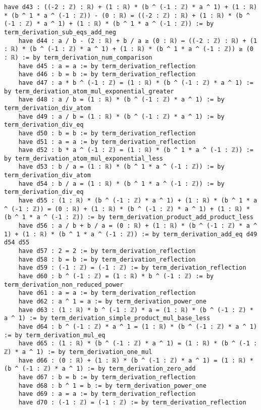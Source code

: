 \documentclass{article}
\begin{document}
\begin{tcolorbox}[colback=white!10, width=\linewidth]
\begin{lstlisting}[language=Lean4]
    have d43 : ((-2 : ℤ) : ℝ) + (1 : ℝ) * (b ^ (-1 : ℤ) * a ^ 1) + (1 : ℝ) * (b ^ 1 * a ^ (-1 : ℤ)) - (0 : ℝ) = ((-2 : ℤ) : ℝ) + (1 : ℝ) * (b ^ (-1 : ℤ) * a ^ 1) + (1 : ℝ) * (b ^ 1 * a ^ (-1 : ℤ)) := by term_derivation_sub_eqs_add_neg
    have d44 : a / b - (2 : ℝ) + b / a ≥ (0 : ℝ) ↔ ((-2 : ℤ) : ℝ) + (1 : ℝ) * (b ^ (-1 : ℤ) * a ^ 1) + (1 : ℝ) * (b ^ 1 * a ^ (-1 : ℤ)) ≥ (0 : ℝ) := by term_derivation_num_comparison
    have d45 : a = a := by term_derivation_reflection
    have d46 : b = b := by term_derivation_reflection
    have d47 : a * b ^ (-1 : ℤ) = (1 : ℝ) * (b ^ (-1 : ℤ) * a ^ 1) := by term_derivation_atom_mul_exponential_greater
    have d48 : a / b = (1 : ℝ) * (b ^ (-1 : ℤ) * a ^ 1) := by term_derivation_div_atom
    have d49 : a / b = (1 : ℝ) * (b ^ (-1 : ℤ) * a ^ 1) := by term_derivation_div_eq
    have d50 : b = b := by term_derivation_reflection
    have d51 : a = a := by term_derivation_reflection
    have d52 : b * a ^ (-1 : ℤ) = (1 : ℝ) * (b ^ 1 * a ^ (-1 : ℤ)) := by term_derivation_atom_mul_exponential_less
    have d53 : b / a = (1 : ℝ) * (b ^ 1 * a ^ (-1 : ℤ)) := by term_derivation_div_atom
    have d54 : b / a = (1 : ℝ) * (b ^ 1 * a ^ (-1 : ℤ)) := by term_derivation_div_eq
    have d55 : (1 : ℝ) * (b ^ (-1 : ℤ) * a ^ 1) + (1 : ℝ) * (b ^ 1 * a ^ (-1 : ℤ)) = (0 : ℝ) + (1 : ℝ) * (b ^ (-1 : ℤ) * a ^ 1) + (1 : ℝ) * (b ^ 1 * a ^ (-1 : ℤ)) := by term_derivation_product_add_product_less
    have d56 : a / b + b / a = (0 : ℝ) + (1 : ℝ) * (b ^ (-1 : ℤ) * a ^ 1) + (1 : ℝ) * (b ^ 1 * a ^ (-1 : ℤ)) := by term_derivation_add_eq d49 d54 d55
    have d57 : 2 = 2 := by term_derivation_reflection
    have d58 : b = b := by term_derivation_reflection
    have d59 : (-1 : ℤ) = (-1 : ℤ) := by term_derivation_reflection
    have d60 : b ^ (-1 : ℤ) = (1 : ℝ) * b ^ (-1 : ℤ) := by term_derivation_non_reduced_power
    have d61 : a = a := by term_derivation_reflection
    have d62 : a ^ 1 = a := by term_derivation_power_one
    have d63 : (1 : ℝ) * b ^ (-1 : ℤ) * a = (1 : ℝ) * (b ^ (-1 : ℤ) * a ^ 1) := by term_derivation_simple_product_mul_base_less
    have d64 : b ^ (-1 : ℤ) * a ^ 1 = (1 : ℝ) * (b ^ (-1 : ℤ) * a ^ 1) := by term_derivation_mul_eq
    have d65 : (1 : ℝ) * (b ^ (-1 : ℤ) * a ^ 1) = (1 : ℝ) * (b ^ (-1 : ℤ) * a ^ 1) := by term_derivation_one_mul
    have d66 : (0 : ℝ) + (1 : ℝ) * (b ^ (-1 : ℤ) * a ^ 1) = (1 : ℝ) * (b ^ (-1 : ℤ) * a ^ 1) := by term_derivation_zero_add
    have d67 : b = b := by term_derivation_reflection
    have d68 : b ^ 1 = b := by term_derivation_power_one
    have d69 : a = a := by term_derivation_reflection
    have d70 : (-1 : ℤ) = (-1 : ℤ) := by term_derivation_reflection

\end{lstlisting}
\end{tcolorbox}
\end{document}
